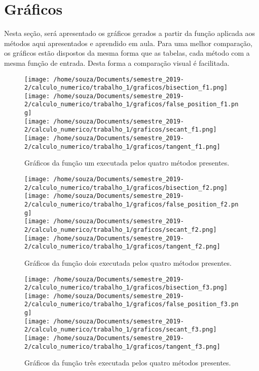 \documentclass[12pt]{article}
\begin{document}
\section{Gráficos}
Nesta seção, será apresentado os gráficos gerados a partir da função aplicada aos métodos aqui apresentados e aprendido em aula. Para uma melhor comparação, os gráficos estão dispostos da mesma forma que as tabelas, cada método com a mesma função de entrada. Desta forma a comparação visual é facilitada.

\begin{figure}[!htb]
    \centering
    \texttt{[image: /home/souza/Documents/semestre\_2019-2/calculo\_numerico/trabalho\_1/graficos/bisection\_f1.png]}
    \texttt{[image: /home/souza/Documents/semestre\_2019-2/calculo\_numerico/trabalho\_1/graficos/false\_position\_f1.png]}\\
    \texttt{[image: /home/souza/Documents/semestre\_2019-2/calculo\_numerico/trabalho\_1/graficos/secant\_f1.png]}
    \texttt{[image: /home/souza/Documents/semestre\_2019-2/calculo\_numerico/trabalho\_1/graficos/tangent\_f1.png]}
    \caption{Gráficos da função um executada pelos quatro métodos presentes.}
\end{figure}

\begin{figure}[!ht]
    \centering
    \texttt{[image: /home/souza/Documents/semestre\_2019-2/calculo\_numerico/trabalho\_1/graficos/bisection\_f2.png]}
    \texttt{[image: /home/souza/Documents/semestre\_2019-2/calculo\_numerico/trabalho\_1/graficos/false\_position\_f2.png]}\\
    \texttt{[image: /home/souza/Documents/semestre\_2019-2/calculo\_numerico/trabalho\_1/graficos/secant\_f2.png]}
    \texttt{[image: /home/souza/Documents/semestre\_2019-2/calculo\_numerico/trabalho\_1/graficos/tangent\_f2.png]}
    \caption{Gráficos da função dois executada pelos quatro métodos presentes.}
\end{figure}

\begin{figure}[!ht]
    \centering
    \texttt{[image: /home/souza/Documents/semestre\_2019-2/calculo\_numerico/trabalho\_1/graficos/bisection\_f3.png]}
    \texttt{[image: /home/souza/Documents/semestre\_2019-2/calculo\_numerico/trabalho\_1/graficos/false\_position\_f3.png]}\\
    \texttt{[image: /home/souza/Documents/semestre\_2019-2/calculo\_numerico/trabalho\_1/graficos/secant\_f3.png]}
    \texttt{[image: /home/souza/Documents/semestre\_2019-2/calculo\_numerico/trabalho\_1/graficos/tangent\_f3.png]}
    \caption{Gráficos da função três executada pelos quatro métodos presentes.}
\end{figure}
\end{document}
